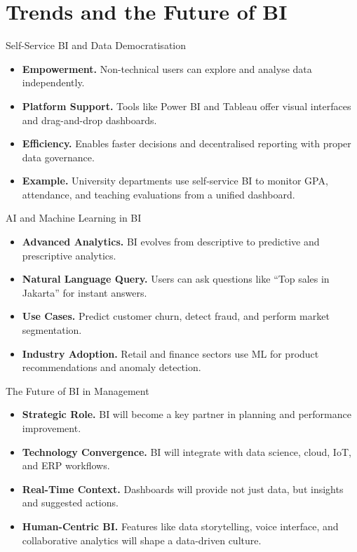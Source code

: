 \documentclass[aspectratio=169, table]{beamer}
\begin{document}
\section{Trends and the Future of BI}

\begin{frame}{Self-Service BI and Data Democratisation}
	\vspace{20pt}
	\begin{itemize}
		\item \textbf{Empowerment.} Non-technical users can explore and analyse data independently.
		\item \textbf{Platform Support.} Tools like Power BI and Tableau offer visual interfaces and drag-and-drop dashboards.
		\item \textbf{Efficiency.} Enables faster decisions and decentralised reporting with proper data governance.
		\item \textbf{Example.} University departments use self-service BI to monitor GPA, attendance, and teaching evaluations from a unified dashboard.
	\end{itemize}
\end{frame}


\begin{frame}{AI and Machine Learning in BI}
	\vspace{20pt}
	\begin{itemize}
		\item \textbf{Advanced Analytics.} BI evolves from descriptive to predictive and prescriptive analytics.
		\item \textbf{Natural Language Query.} Users can ask questions like “Top sales in Jakarta” for instant answers.
		\item \textbf{Use Cases.} Predict customer churn, detect fraud, and perform market segmentation.
		\item \textbf{Industry Adoption.} Retail and finance sectors use ML for product recommendations and anomaly detection.
	\end{itemize}
\end{frame}


\begin{frame}{The Future of BI in Management}
	\vspace{20pt}
	\begin{itemize}
		\item \textbf{Strategic Role.} BI will become a key partner in planning and performance improvement.
		\item \textbf{Technology Convergence.} BI will integrate with data science, cloud, IoT, and ERP workflows.
		\item \textbf{Real-Time Context.} Dashboards will provide not just data, but insights and suggested actions.
		\item \textbf{Human-Centric BI.} Features like data storytelling, voice interface, and collaborative analytics will shape a data-driven culture.
	\end{itemize}
\end{frame}
\end{document}
